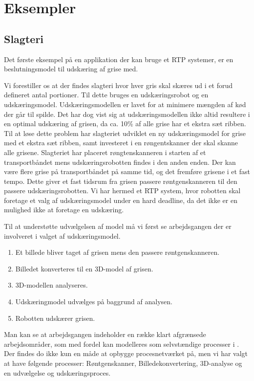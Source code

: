 \section{Eksempler}
\subsection{Slagteri}

Det første eksempel på en applikation der kan bruge et RTP systemer, er en beslutningsmodel til udskæring af grise med.

Vi forestiller os at der findes slagteri hvor  hver gris skal skæres ud i et forud defineret antal portioner. Til dette bruges en udskæringsrobot og en udskæringsmodel. Udskæringsmodellen er lavet for at minimere mængden af kød der går til spilde.  Det har dog vist sig at udskæringsmodellen ikke altid resultere i en  optimal udskæring af grisen, da  ca. 10\% af alle grise har et ekstra sæt ribben. Til at løse dette problem har slagteriet udviklet en ny udskæringsmodel for grise med et ekstra sæt ribben, samt  investeret i en røngentskanner der skal skanne alle grisene. 
Slagteriet har placeret røngtenskanneren i starten af et transportbåndet mens udskæringsrobotten findes i den anden enden. Der kan være flere grise på transportbåndet på samme tid, og det fremføre grisene i et fast tempo. Dette giver et fast tidsrum fra grisen passere røntgenskanneren til den passere udskæringsrobotten. Vi har hermed et RTP system, hvor robotten skal foretage et valg af udskæringsmodel under en hard deadline, da det ikke er en mulighed ikke at foretage en udskæring.

Til at understøtte udvælgelsen af model må vi først se arbejdsgangen der er involveret i valget af udskæringsmodel. 
\begin{enumerate}
\tightlist
	\item Et billede bliver taget af grisen mens den passere røntgenskanneren.
	\item Billedet konverteres til en 3D-model af grisen.
	\item 3D-modellen analyseres.
	\item Udskæringmodel udvælges på baggrund af analysen.
	\item Robotten udskærer grisen.
\end{enumerate}

Man kan se at arbejdsgangen indeholder en  række klart afgrænsede arbejdsområder, som med fordel kan modelleres som selvstændige processer i \pycsp. Der findes do ikke kun en måde at opbygge procesnetværket på, men vi har valgt at have følgende processer: Røntgenskanner, Billedekonvertering, 3D-analyse og en udvælgelse og udskæringsproces. 


